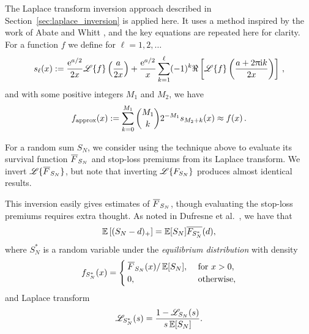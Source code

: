 The Laplace transform inversion approach described in Section~\ref{sec:laplace_inversion} is applied here. It uses a method inspired by the work of Abate and Whitt \cite{Abate1992}, and the key equations are repeated here for clarity. For a function $f$ we define for $\ell=1,2,\dots$
\begin{equation*}
s_\ell(x) := \frac{\mathrm{e}^{a/2}}{2x}\mathscr{L}\{f\} \left(\frac{a}{2 x}\right) + \frac{\mathrm{e}^{a/2}}{x} \sum_{k=1}^\ell (-1)^{k} \Re\left[\mathscr{L}\{f\}\left(\frac{a+ 2\uppi \mathrm{i} k}{2 x}\right)\right] \,,
\end{equation*}
and with some positive integers $M_1$ and $M_2$, we have
\begin{equation} \label{eq:LaplaceInversion}
f_{\text{approx}}(x) := \sum_{k=0}^{M_1} \binom{M_1}{k} 2^{-M_1} s_{M_2+k}(x) \approx f(x) \,.
\end{equation}



For a random sum $S_N$, we consider using the technique above to evaluate its survival function $\Ftail_{S_N}$ and stop-loss premiums from its Laplace transform.
We invert $\LT{\Ftail_{S_N}}$, but note that inverting $\mathscr{L}\{F_{S_N}\}$ produces almost identical results.

This inversion easily gives estimates of $\Ftail_{S_N}$, though evaluating the stop-loss premiums requires extra thought.
As noted in Dufresne et al.\ \cite{DuGaMo09}, we have that
\begin{equation}\label{eq:LinkStopLossPremiumEquilibriumDistribution}
\operatorname{{\mathbb E}}\left[(S_N-d)_{+}\right]=\operatorname{{\mathbb E}}[S_N]\overline{F_{S_N^{\ast}}}(d),
\end{equation}
where $S_N^{\ast}$ is a random variable under the \emph{equilibrium distribution} with density
\begin{equation*}
f_{S_N^{\ast}}(x)=\begin{cases}
\Ftail_{S_N}(x) / \Exp[S_N],&\text{ for }x>0,\\
0,&\text{ otherwise},
\end{cases}
\end{equation*}
and Laplace transform
\begin{equation*}\label{eq:LaplaceTransformEquilibriumDistribution}
\mathscr{L}_{S_N^{\ast}}(s)=\frac{1-\mathscr{L}_{S_N}(s)}{s\operatorname{{\mathbb E}}[S_N]}.
\end{equation*}

